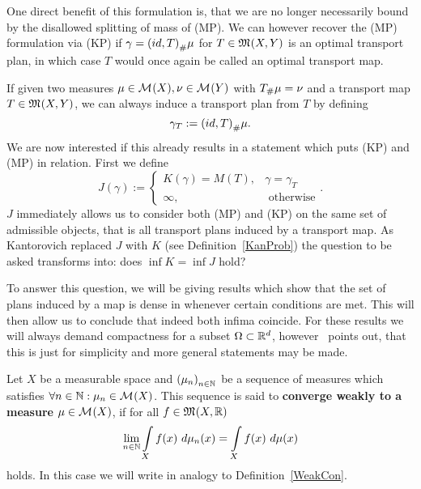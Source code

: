 One direct benefit of this formulation is, that we are no longer necessarily bound by the disallowed splitting of mass of (MP). We can however recover the (MP) formulation via (KP) if $\gamma = \push[(id, T)]{\mu}$ for $T \in \MF{X}{Y}$ is an optimal transport plan, in which case $T$ would once again be called an optimal transport map.

If given two measures $\mu \in \M{X}, \nu \in \M{Y}$ with $\push{\mu} = \nu$ and a transport map $T \in \MF{X}{Y}$, we can always induce a transport plan from $T$ by defining
\begin{equation}\label{IndPlan}
	\gamma_T := \push[(id, T)]{\mu}.
\end{equation}
We are now interested if this already results in a statement which puts (KP) and (MP) in relation. First we define
\[ J(\gamma) := 
	\begin{cases}
		K(\gamma) = M(T), & \gamma = \gamma_T \\
		\infty, & \text{ otherwise}
	\end{cases}. \]
$J$ immediately allows us to consider both (MP) and (KP) on the same set of admissible objects, that is all transport plans induced by a transport map. As Kantorovich replaced $J$ with $K$ (see Definition~\ref{KanProb}) the question to be asked transforms into: does $\inf K = \inf J$ hold?

To answer this question, we will be giving results which show that the set of plans induced by a map is dense in \TP{\mu, \nu} whenever certain conditions are met. This will then allow us to conclude that indeed both infima coincide. For these results we will always demand compactness for a subset $\Omega \subset \R^d$, however~\cite{San2015} points out, that this is just for simplicity and more general statements may be made.

\begin{definition}\label{WeakConMeas}
	Let $X$ be a measurable space and ${(\mu_n)}_{\NinN}$ be a sequence of measures which satisfies $\forall \NinN: \mu_n \in \M{X}$. This sequence is said to \textbf{converge weakly to a measure} $\mu \in \M{X}$, if for all $f \in \MF{X}{\R}$ 
	\[ \lim\limits_{\NinN} \int\limits_X f(x)~d\mu_n(x) = \int\limits_X f(x)~d\mu(x) \]
	holds. In this case we will write  in analogy to Definition~\ref{WeakCon}.
\end{definition}

